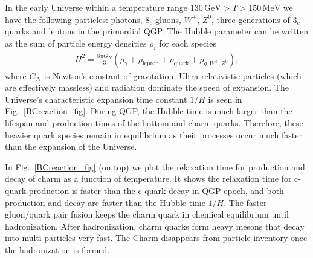 \documentclass[universe,article,submit,moreauthors,pdftex,a4paper]{Definitions/mdpi}
\newcommand*{\rf}[1]{Fig.~{\ref{#1}}}
\begin{document}
In the early Universe within a temperature range $130\, \mathrm{GeV}>T>150\, \mathrm{MeV}$  we have the following particles:  photons, $8_c$-gluons, $W^\pm$, $Z^0$, three generations of $3_c$-quarks and leptons  in the primordial QGP.  The Hubble parameter can be written as the sum of particle energy densities $\rho_i$ for each species
\begin{align}
H^2=\frac{8\pi G_{N}}{3}\left(\rho_\gamma+\rho_{\mathrm{lepton}}+\rho_{\mathrm{quark}}+\rho_{g,{W^\pm},{Z^0}}\right),
\end{align}
where $G_{N}$ is Newton's constant of gravitation. Ultra-relativistic particles (which are effectively massless) and radiation dominate the speed of expansion. The Universe's characteristic expansion time constant $1/H$ is seen in  \rf{BCreaction_fig}. During QGP, the Hubble time is much larger than the lifespan and production times of the bottom and charm quarks. Therefore, these heavier quark species remain in equilibrium as their processes occur much faster than the expansion of the Universe.

In Fig.~\ref{BCreaction_fig} (on top) we plot the relaxation time for production and decay of charm as a function of temperature. It shows the relaxation time for c-quark production is faster than the c-quark decay in QGP epoch, and both production and decay are faster than the Hubble time $1/H$. The faster gluon/quark pair fusion keeps the charm quark in chemical equilibrium until hadronization. After hadronization, charm quarks form heavy mesons that decay into multi-particles very fast. The Charm disappears from particle inventory once the hadronization is formed. %
\end{document}
